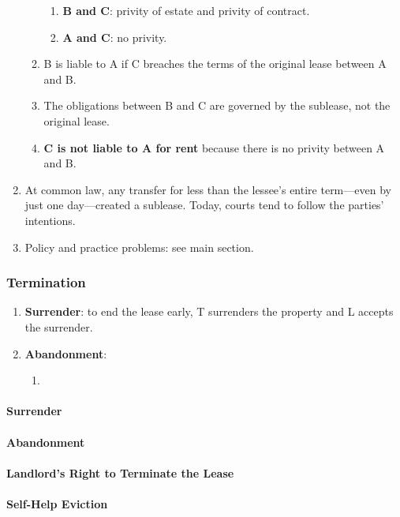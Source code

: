 \begin{enumerate}
\begin{enumerate}
\begin{enumerate}
            \item \textbf{B and C}: privity of estate and privity of contract.
            \item \textbf{A and C}: no privity.
        \end{enumerate}
        \item B is liable to A if C breaches the terms of the original lease 
        between A and B.
        \item The obligations between B and C are governed by the sublease, 
        not the original lease.
        \item \textbf{C is not liable to A for rent} because there is no 
        privity between A and B.
    \end{enumerate}
    \item At common law, any transfer for less than the lessee's entire 
    term---even by just one day---created a sublease. Today, courts tend to 
    follow the parties' intentions.
    \item Policy and practice problems: see main section.
\end{enumerate}

\subsubsection{Termination} %

\begin{enumerate}
    \item \textbf{Surrender}: to end the lease early, T surrenders the 
    property and L accepts the surrender.
    \item \textbf{Abandonment}:
    \begin{enumerate}
        \item 
    \end{enumerate}
\end{enumerate}

\paragraph{Surrender} %
\paragraph{Abandonment} %
\paragraph{Landlord's Right to Terminate the Lease} %
\paragraph{Self-Help Eviction} %
